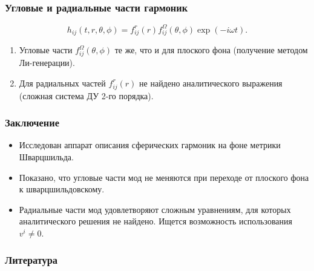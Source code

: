 \documentclass[compress]{beamer}
\def\docroot{../..}
\begin{document}
    \begin{frame}\frametitle{Угловые и радиальные части гармоник}

        \begin{equation*}
            h_{ij}(t,r,\theta,\phi) = f^r_{ij}(r) f^\Omega_{ij}(\theta,\phi) \exp(-i \omega t) .
        \end{equation*}

        \begin{enumerate}
            \item Угловые части $f^\Omega_{ij}(\theta,\phi)$ те же, что и для плоского фона (получение методом Ли-генерации).
            \item Для радиальных частей $f^r_{ij}(r)$ не найдено аналитического выражения (сложная система ДУ 2-го порядка).
        \end{enumerate}

    \end{frame}

    \begin{frame}\frametitle{Заключение}

        \begin{itemize}
            \item Исследован аппарат описания сферических гармоник на фоне метрики Шварцшильда.
            \item Показано, что угловые части мод не меняются при переходе от плоского фона к шварцшильдовскому.
            \item Радиальные части мод удовлетворяют сложным уравнениям, для которых аналитического решения не найдено. Ищется возможность использования $v^i \neq 0$.
        \end{itemize}

    \end{frame}

    \begin{frame}\frametitle{Литература}

        {\tiny{
        
        
        }}

    \end{frame}
\end{document}
